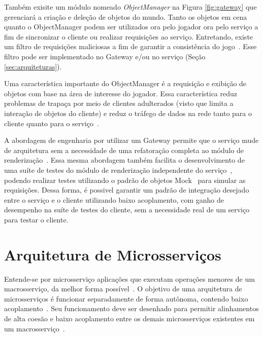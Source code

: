 Também exisite um módulo nomeado \textit{ObjectManager} na Figura \ref{fig:gateway} que gerenciará a criação e deleção de objetos do mundo.
%
Tanto os objetos em cena quanto o ObjectManager podem ser utilizados ora pelo jogador ora pelo serviço a fim de sincronizar o cliente ou realizar requisições ao serviço.
%
Entretando, existe um filtro de requisições maliciosas a fim de garantir a consistência do jogo~\cite{albion_online_unite}.
%
Esse filtro pode ser implementado no Gateway e/ou no serviço (Seção \ref{sec:arquiteturas}).



Uma característica importante do ObjectManager é a requisição e exibição de objetos com base na área de interesse do jogador.
%
Essa característica reduz problemas de trapaça por meio de clientes adulterados (visto que limita a interação de objetos do cliente) e reduz o tráfego de dados na rede tanto para o cliente quanto para o serviço~\cite{albion_online_unite, stephenclarkewillson2017}.



A abordagem de engenharia por utilizar um Gateway permite que o serviço mude de arquitetura sem a necessidade de uma refatoração completa ao módulo de renderização~\cite{albion_online_unite, stephenclarkewillson2017}.
%
Essa mesma abordagem também facilita o desenvolvimento de uma suíte de testes do módulo de renderização independente do serviço~\cite{Freeman2009Oct}, podendo realizar testes utilizando o padrão de objetos Mock~\cite{Beck2004Nov} para simular as requisições.
%
Dessa forma, é possivel garantir um padrão de integração desejado entre o serviço e o cliente utilizando baixo acoplamento, com ganho de desempenho na suíte de testes do cliente, sem a necessidade real de um serviço para testar o cliente.



\section{Arquitetura de Microsserviços}
\label{sec:microsservicos}



Entende-se por microsserviço aplicações que executam operações menores de um macrosserviço, da melhor forma possível~\cite{stephenclarkewillson2017, Newman2015Feb}.
%
O objetivo de uma arquitetura de microsserviços é funcionar separadamente de forma autônoma, contendo baixo acoplamento~\cite{Newman2015Feb}.
%
Seu funcionamento deve ser desenhado para permitir alinhamentos de alta coesão e baixo acoplamento entre os demais microsserviços existentes em um macrosserviço~\cite{8169955}.



